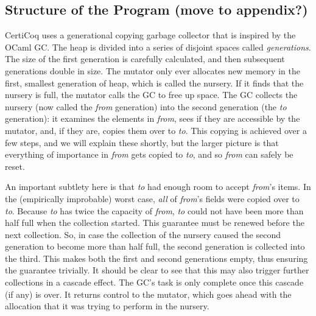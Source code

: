 
\subsection{Structure of the Program {\color{magenta}(move to appendix?)}}
\label{sec:gcstructure}


CertiCoq uses a generational copying garbage collector 
that is inspired by the OCaml GC. 
The heap is divided into a series of disjoint
spaces called \emph{generations}. The size of the first generation
is carefully calculated, and then subsequent generations
{\color{magenta}double in size}.
The mutator only ever allocates new memory in the first, 
smallest generation of heap, which is called the nursery. 
If it finds that the nursery is full, 
the mutator calls the GC to free up space.
The GC collects the nursery 
(now called the \emph{from} generation)
into the second generation (the \emph{to} generation): 
it examines the elements 
in \emph{from}, sees if they are accessible by
the mutator, and, if they are, 
copies them over to \emph{to}. This copying is achieved over a few steps, 
and we will explain these shortly, but the larger picture is that 
everything of importance in \emph{from} gets copied to \emph{to}, 
and so \emph{from} can safely be reset. 

An important subtlety here is that \emph{to} had enough 
room to accept \emph{from}'s items. 
In the (empirically improbable) worst case, 
\emph{all} of \emph{from}'s fields were copied over to \emph{to}.
Because \emph{to} has twice the capacity of \emph{from},
\emph{to} could not have been more than half full when 
the collection started.
This guarantee must be renewed before the next collection. 
So, in case the collection of the nursery caused
the second generation to become more than half full, 
the second generation is collected into the third. This makes 
both the first and second generations empty, thus ensuring 
the guarantee trivially. It should be 
clear to see that this may also trigger further collections in 
a cascade effect. The GC's task is only complete once this 
cascade (if any) is over. It returns control to the mutator,
which goes ahead with 
the allocation that it was trying to perform in the nursery.

